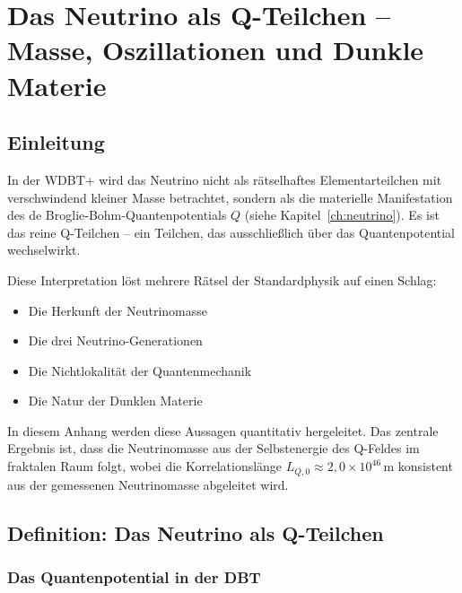 
\chapter{Das Neutrino als Q-Teilchen – Masse, Oszillationen und Dunkle Materie}
\label{app:neutrino_oszillation}

\section{Einleitung}
\label{app:neutrino_oszillation_einleitung}

In der WDBT+ wird das Neutrino nicht als rätselhaftes Elementarteilchen mit verschwindend kleiner Masse betrachtet, sondern als die materielle Manifestation des de Broglie-Bohm-Quantenpotentials \( Q \) (siehe Kapitel~\ref{ch:neutrino}). Es ist das reine Q-Teilchen – ein Teilchen, das ausschließlich über das Quantenpotential wechselwirkt.

Diese Interpretation löst mehrere Rätsel der Standardphysik auf einen Schlag:
\begin{itemize}
    \item Die Herkunft der Neutrinomasse
    \item Die drei Neutrino-Generationen
    \item Die Nichtlokalität der Quantenmechanik
    \item Die Natur der Dunklen Materie
\end{itemize}

In diesem Anhang werden diese Aussagen quantitativ hergeleitet. Das zentrale Ergebnis ist, dass die Neutrinomasse aus der Selbstenergie des Q-Feldes im fraktalen Raum folgt, wobei die Korrelationslänge \( L_{Q,0} \approx 2{,}0 \times 10^{46}\,\text{m} \) konsistent aus der gemessenen Neutrinomasse abgeleitet wird.

\section{Definition: Das Neutrino als Q-Teilchen}
\label{app:neutrino_oszillation_definition}

\subsection{Das Quantenpotential in der DBT}
\label{sub:neutrino_oszillation_quantenpotential}

